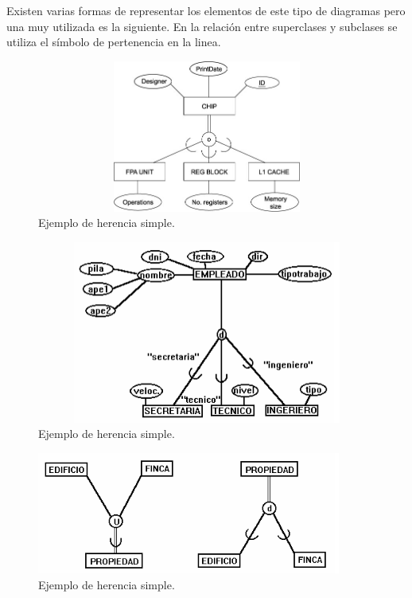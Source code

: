 \documentclass[12pt, titlepage]{article}
\begin{document}
    Existen varias formas de representar los elementos de este tipo de diagramas pero una muy utilizada es la siguiente.
    En la relación entre superclases y subclases se utiliza el símbolo de pertenencia en la linea.
    \begin{figure}[H]
        \begin{center}
            \includegraphics[width=12cm, height=5cm]{img/notacion1.jpg}
            \caption{Ejemplo de herencia simple.}
            \label{fig:notacion1}
        \end{center}
    \end{figure}
    \begin{figure}[H]
        \begin{center}
            \includegraphics[width=12cm, height=6cm]{img/notacion2.png}
            \caption{Ejemplo de herencia simple.}
            \label{fig:notacion2}
        \end{center}
    \end{figure}
    \begin{figure}[H]
        \begin{center}
            \includegraphics[width=10cm, height=4cm]{img/notacion4.png}
            \caption{Ejemplo de herencia simple.}
            \label{fig:ejemplo4}
        \end{center}
    \end{figure}
\end{document}
